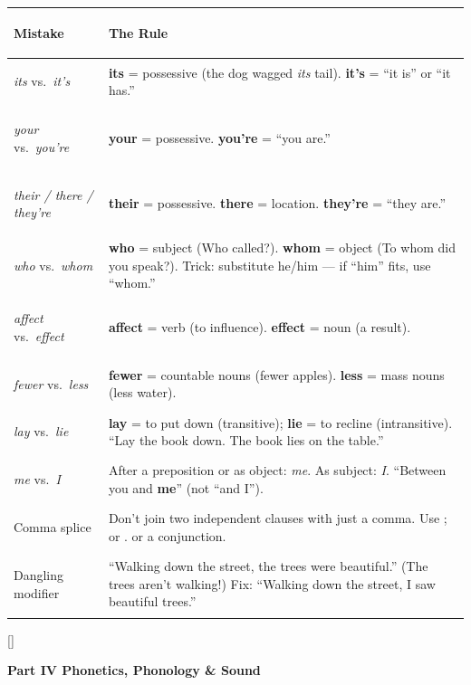 \documentclass[11pt, letterpaper]{article}
\newcommand{\tealsections}{%
  \titleformat{\section}{\large\bfseries\color{sectionteal}}{}{0em}{}[\color{sectionteal}\titlerule]%
  \titleformat{\subsection}{\normalsize\bfseries\color{sectionteal!80!black}}{}{0em}{}%
}
\newcommand{\partbanner}[3]{%
  \begin{tcolorbox}[colback=#1, colframe=#2, boxrule=1.2pt, arc=4pt,
    left=8pt, right=8pt, top=6pt, bottom=6pt]
    \begin{center}{\LARGE\bfseries #3}\end{center}
  \end{tcolorbox}%
}
\begin{document}
\noindent
{\small\renewcommand{\arraystretch}{1.5}
\begin{tabularx}{\textwidth}{>{\bfseries\raggedright\arraybackslash}p{4cm}
                              >{\raggedright\arraybackslash}X}
\toprule
\rowcolor{tableheaderorange}
\textbf{Mistake} & \textbf{The Rule} \\
\midrule
\rowcolor{rowOr} \emph{its} vs.\ \emph{it's}    & \textbf{its} = possessive (the dog wagged \emph{its} tail). \textbf{it's} = ``it is'' or ``it has.'' \\
\rowcolor{rowA}  \emph{your} vs.\ \emph{you're}  & \textbf{your} = possessive. \textbf{you're} = ``you are.'' \\
\rowcolor{rowOr} \emph{their / there / they're} & \textbf{their} = possessive. \textbf{there} = location. \textbf{they're} = ``they are.'' \\
\rowcolor{rowA}  \emph{who} vs.\ \emph{whom}     & \textbf{who} = subject (Who called?). \textbf{whom} = object (To whom did you speak?). Trick: substitute he/him --- if ``him'' fits, use ``whom.'' \\
\rowcolor{rowOr} \emph{affect} vs.\ \emph{effect}& \textbf{affect} = verb (to influence). \textbf{effect} = noun (a result). \\
\rowcolor{rowA}  \emph{fewer} vs.\ \emph{less}   & \textbf{fewer} = countable nouns (fewer apples). \textbf{less} = mass nouns (less water). \\
\rowcolor{rowOr} \emph{lay} vs.\ \emph{lie}      & \textbf{lay} = to put down (transitive); \textbf{lie} = to recline (intransitive). ``Lay the book down. The book lies on the table.'' \\
\rowcolor{rowA}  \emph{me} vs.\ \emph{I}         & After a preposition or as object: \emph{me}. As subject: \emph{I}. ``Between you and \textbf{me}'' (not ``and I''). \\
\rowcolor{rowOr} Comma splice                    & Don't join two independent clauses with just a comma. Use ; or . or a conjunction. \\
\rowcolor{rowA}  Dangling modifier               & ``Walking down the street, the trees were beautiful.'' (The trees aren't walking!) Fix: ``Walking down the street, I saw beautiful trees.'' \\
\bottomrule
\end{tabularx}}

\newpage

\tealsections
{}
\partbanner{part5bg}{sectionteal}{Part IV \quad Phonetics, Phonology \& Sound}
\end{document}
